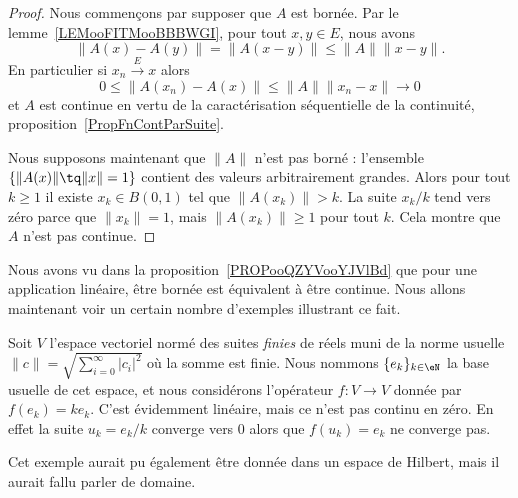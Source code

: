 \begin{proof}
    Nous commençons par supposer que \( A\) est bornée. Par le lemme~\ref{LEMooFITMooBBBWGI}, pour tout \( x,y\in E\), nous avons
    \begin{equation}
        \| A(x)-A(y) \|=\| A(x-y) \|\leq \| A \|\| x-y \|.
    \end{equation}
    En particulier si \( x_n\stackrel{E}{\longrightarrow}x\) alors
    \begin{equation}
        0\leq \| A(x_n)-A(x) \|\leq \| A \|\| x_n-x \|\to 0
    \end{equation}
    et \( A\) est continue en vertu de la caractérisation séquentielle de la continuité, proposition~\ref{PropFnContParSuite}.

    Nous supposons maintenant que \( \| A \|\) n'est pas borné : l'ensemble \( \{ \| A(x) \|\tq \| x \|=1 \}\) contient des valeurs arbitrairement grandes. Alors pour tout \( k\geq 1\) il existe \( x_k\in B(0,1)\) tel que \( \| A(x_k) \|>k\). La suite \( x_k/k\) tend vers zéro parce que \( \| x_k \|=1\), mais \( \| A(x_k) \|\geq 1\) pour tout \( k\). Cela montre que \( A\) n'est pas continue.
\end{proof}


Nous avons vu dans la proposition~\ref{PROPooQZYVooYJVlBd} que pour une application linéaire, être bornée est équivalent à être continue. Nous allons maintenant voir un certain nombre d'exemples illustrant ce fait.

\begin{example}  \label{ExHKsIelG}
    Soit \( V\) l'espace vectoriel normé des suites \emph{finies} de réels muni de la norme usuelle $\| c \|=\sqrt{\sum_{i=0}^{\infty}| c_i |^2}$ où la somme est finie. Nous nommons \( \{ e_k \}_{k\in \eN}\) la base usuelle de cet espace, et nous considérons l'opérateur \( f\colon V\to V\) donnée par \( f(e_k)=ke_k\). C'est évidemment linéaire, mais ce n'est pas continu en zéro. En effet la suite \( u_k=e_k/k\) converge vers \( 0\) alors que \( f(u_k)=e_k\) ne converge pas.
\end{example}

Cet exemple aurait pu également être donnée dans un espace de Hilbert, mais il aurait fallu parler de domaine.

